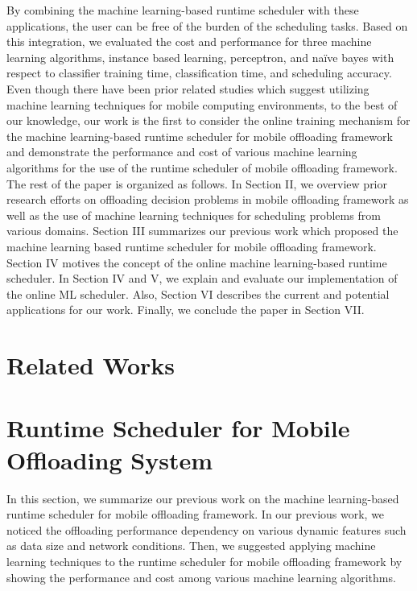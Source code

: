 \documentclass[10pt, conference, compsocconf]{IEEEtran}
\begin{document}
%
By combining the machine learning-based runtime scheduler with these
applications, the user can be free of the burden of the scheduling
tasks.
%
Based on this integration, we evaluated the cost and performance for
three machine learning algorithms, instance based learning, perceptron,
and na\"{i}ve bayes with respect to classifier training time,
classification time, and scheduling accuracy.
%
Even though there have been prior related studies which suggest
utilizing machine learning techniques for mobile computing environments,
to the best of our knowledge, our work is the first to consider the
online training mechanism for the machine learning-based runtime
scheduler for mobile offloading framework and demonstrate the
performance and cost of various machine learning algorithms for the use
of the runtime scheduler of mobile offloading framework.\\   
%
\indent The rest of the paper is organized as follows.
%
In Section II, we overview prior research efforts on offloading decision
problems in mobile offloading framework as well as the use of machine
learning techniques for scheduling problems from various domains.
%
Section III summarizes our previous work which proposed the machine
learning based runtime scheduler for mobile offloading framework.
%
Section IV motives the concept of the online machine learning-based
runtime scheduler.
%
In Section IV and V, we explain and evaluate our implementation of the
online ML scheduler.
%
Also, Section VI describes the current and potential applications for
our work.
%
Finally, we conclude the paper in Section VII.
%
\section{Related Works}
%
\section{Runtime Scheduler for Mobile Offloading System}
%
In this section, we summarize our previous work on the machine
learning-based runtime scheduler for mobile offloading framework.
%
In our previous work, we noticed the offloading performance dependency on
various dynamic features such as data size and network conditions.
%
Then, we suggested applying machine learning techniques to the runtime
scheduler for mobile offloading framework by showing the performance and
cost among various machine learning algorithms. 
% 
\end{document}
